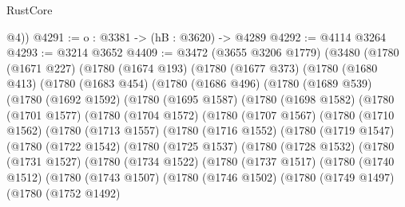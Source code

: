 \begin{lexlean}{RustCore}
\begin{coremodule}
        @4))
@4291 := {o : @3381} -> (hB : @3620) -> @4289
@4292 := @4114 @3264
@4293 := @3214 @3652
@4409 := @3472
    (@3655 @3206 @1779)
    (@3480
      (@1780
        (@1671 @227)
        (@1780
          (@1674 @193)
          (@1780
            (@1677 @373)
            (@1780
              (@1680 @413)
              (@1780
                (@1683 @454)
                (@1780
                  (@1686 @496)
                  (@1780
                    (@1689 @539)
                    (@1780
                      (@1692 @1592)
                      (@1780
                        (@1695 @1587)
                        (@1780
                          (@1698 @1582)
                          (@1780
                            (@1701 @1577)
                            (@1780
                              (@1704 @1572)
                              (@1780
                                (@1707 @1567)
                                (@1780
                                  (@1710 @1562)
                                  (@1780
                                    (@1713 @1557)
                                    (@1780
                                      (@1716 @1552)
                                      (@1780
                                        (@1719 @1547)
                                        (@1780
                                          (@1722 @1542)
                                          (@1780
                                            (@1725 @1537)
                                            (@1780
                                              (@1728 @1532)
                                              (@1780
                                                (@1731 @1527)
                                                (@1780
                                                  (@1734 @1522)
                                                  (@1780
                                                    (@1737 @1517)
                                                    (@1780
                                                      (@1740 @1512)
                                                      (@1780
                                                        (@1743 @1507)
                                                        (@1780
                                                          (@1746 @1502)
                                                          (@1780
                                                            (@1749 @1497)
                                                            (@1780
                                                              (@1752 @1492)

\end{coremodule}
\end{lexlean}
